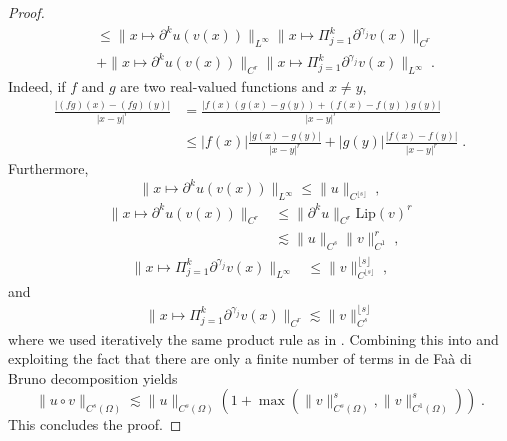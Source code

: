 \documentclass{article}
\newcommand{\1}{\mathds{1}}
\theoremstyle{plain}
\theoremstyle{definition}
\theoremstyle{remark}
\begin{document}
\begin{proof}
\begin{equation}
\begin{aligned}
            &\leq
            \|x \mapsto \partial^k u(v(x)) \|_{L^{\infty}}
            \|x \mapsto \Pi_{j = 1}^k \partial^{\gamma_j} v(x)\|_{C^r} \\
            &+
            \|x \mapsto \partial^k u(v(x)) \|_{C^r}
            \|x \mapsto \Pi_{j = 1}^k \partial^{\gamma_j} v(x)\|_{L^{\infty}} \;.
        \end{aligned}
    \end{equation}
    Indeed, if $f$ and $g$ are two real-valued functions and $x \neq y$,
    \begin{equation}
    \begin{aligned}
        \frac{|(fg)(x) - (fg)(y)|}{|x - y|^r} &= \frac{|f(x)(g(x) - g(y)) +  (f(x) - f(y)) g(y)|}{|x - y|^r} \\
        &\leq 
        | f(x) | \frac{|g(x) - g(y)|}{|x - y|^r} + | g(y) |\frac{|f(x) - f(y)|}{|x - y|^r} \;.
        \end{aligned}
    \end{equation}
    Furthermore, 
    \begin{equation}
        \|x \mapsto \partial^k u(v(x)) \|_{L^{\infty}} \leq \| u \|_{C^{\lfloor s \rfloor}} \;,
    \end{equation}
    \begin{equation}
        \begin{aligned}
            \|x \mapsto \partial^k u(v(x)) \|_{C^r}
            &\leq 
            \|\partial^k u \|_{C^r} \mathrm{Lip}(v)^r \\
            &\lesssim \|u \|_{C^s} \|v \|_{C^1}^r \;,
        \end{aligned}
    \end{equation}
    \begin{equation}
        \begin{aligned}
            \|x \mapsto \Pi_{j = 1}^k \partial^{\gamma_j} v(x)\|_{L^{\infty}}
            &\leq 
            \|v\|_{C^{\lfloor s \rfloor}}^{\lfloor s \rfloor} \;,
        \end{aligned}
    \end{equation}
    and 
    \begin{equation}
        \begin{aligned}
            \|x \mapsto \Pi_{j = 1}^k \partial^{\gamma_j} v(x)\|_{C^r} 
            \lesssim 
            \|v\|_{C^{s}}^{\lfloor s \rfloor}
        \end{aligned}
    \end{equation}
    where we used iteratively the same product rule as in .
    Combining this into  and exploiting the fact that there are only a finite number of terms in de Faà di Bruno decomposition yields
    \begin{equation}
        \| u \circ v\|_{C^{s}(\Omega)} \lesssim \| u \|_{C^{s}(\Omega)} (1 + \max (\| v\|_{C^{s}(\Omega)}^s, \| v\|_{C^{1}(\Omega)}^s)) \;.
    \end{equation}
    This concludes the proof.
\end{proof}
\end{document}
